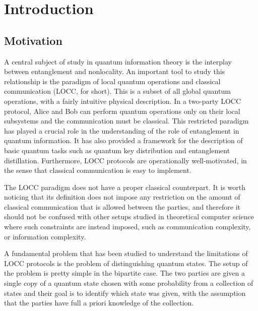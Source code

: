 \chapter{Introduction}
\label{chap:introduction}


\section{Motivation}

A central subject of study in quantum information theory is 
the interplay between entanglement and nonlocality.
An important tool to study this relationship is the paradigm
of local quantum operations and classical communication (LOCC, for short). 
This is a subset of all global quantum operations, 
with a fairly intuitive physical description. 
In a two-party LOCC protocol, 
Alice and Bob can perform quantum operations only on their local
subsystems and the communication must be classical.
This restricted paradigm has played a crucial role in the understanding 
of the role of entanglement in quantum information. It has also provided a 
framework for the description of basic quantum tasks such as quantum key 
distribution and entanglement distillation.
Furthermore, LOCC protocols are operationally well-motivated, in the sense
that classical communication is easy to implement.

The LOCC paradigm does not have a proper classical counterpart.
It is worth noticing that its definition does not impose any restriction on the amount of 
classical communication that is allowed between the parties, and therefore it should not be
confused with other setups studied in theoretical computer science where such 
constraints are instead imposed, such as communication complexity, or information complexity.  

A fundamental problem that has been studied to understand the limitations of 
LOCC protocols is the problem of distinguishing quantum states.
The setup of the problem is pretty simple in the bipartite case.
The two parties are given a single copy of a quantum state chosen
with some probability from a collection of states and their goal is to identify 
which state was given, with the assumption that the parties have full 
a priori knowledge of the collection.


